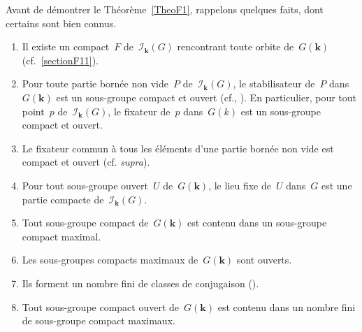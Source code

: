\documentclass[french]{amsart}
\newcommand{\kk}{\mathbf{k}}
\newcommand{\Ik}{\mathscr{I}_\kk}
\begin{document}
Avant de démontrer le Théorème~\ref{TheoF1}, rappelons quelques faits, dont certains
sont bien connus.
\begin{enumerate}[label=\alph*.]
\item \label{a.} Il existe un compact~$F$ de~$\Ik(G)$ rencontrant toute orbite de~$G(\kk)$ (cf.~\ref{sectionF11}).
\item \label{b.} Pour toute partie bornée non vide~$P$ de~$\Ik(G)$, le stabilisateur de~$P$ dans~$G(\kk)$ est un sous-groupe compact et ouvert (cf.\cite[3.2]{Tit79}, \cite[Introduction]{BT72}).
En particulier, pour tout point~$p$ de~$\Ik (G)$, le fixateur de~$p$
dans~$G(k)$ est un sous-groupe compact et ouvert.
\item \label{c.} Le fixateur commun à tous les éléments d'une partie bornée non vide est
compact et ouvert (cf. \emph{supra}).
\item \label{d.} Pour tout sous-groupe ouvert~$U$ de~$G(\kk)$, le lieu fixe de~$U$ dans~$G$ est une partie compacte de~$\Ik(G)$.
\item \label{e.} Tout sous-groupe compact de~$G(\kk)$ est contenu dans un sous-groupe compact maximal.
\item \label{f.} Les sous-groupes compacts maximaux de~$G(\kk)$ sont ouverts.
\item \label{g.} Ils forment un nombre fini de classes de conjugaison (\cite[3.3.3]{BT72}).
\item \label{h.} Tout sous-groupe compact ouvert de~$G(\kk)$ est contenu dans un nombre fini de sous-groupe compact maximaux.
\end{enumerate}
\end{document}
